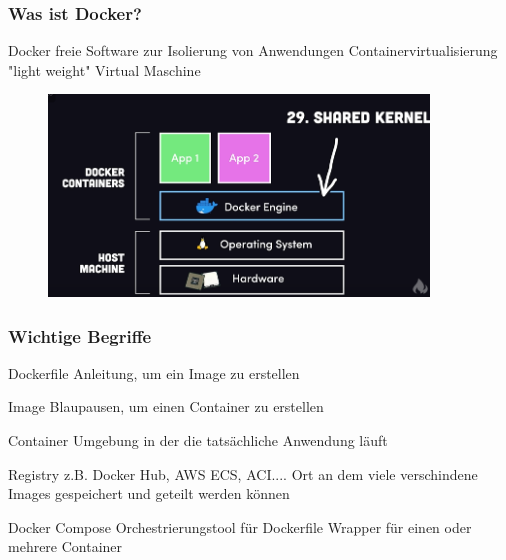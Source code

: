 \documentclass[22pt]{beamer}
\begin{document}
\begin{frame}[t]
    \frametitle{Was ist Docker?}
    \begin{block}{Docker}
        freie Software zur Isolierung von Anwendungen\newline
        Containervirtualisierung\newline
        "light weight" Virtual Maschine\newline
    \end{block}
    \begin{figure}[h]
        \centering
        \includegraphics[width=0.9\textwidth]{Bilder/Docker Concept.png}
    \end{figure}
\end{frame}


\begin{frame}[t]
    \frametitle{Wichtige Begriffe}
    \begin{block}{Dockerfile}
        Anleitung, um ein Image zu erstellen
    \end{block}
    \begin{block}{Image}
        Blaupausen, um einen Container zu erstellen
    \end{block}
    \begin{block}{Container}
        Umgebung in der die tatsächliche Anwendung läuft
    \end{block} \pause
    \begin{block}{Registry}
        z.B. Docker Hub, AWS ECS, ACI....
        Ort an dem viele verschindene Images gespeichert und geteilt werden können
    \end{block}
    \begin{block}{Docker Compose}
        Orchestrierungstool für Dockerfile\newline
        Wrapper für einen oder mehrere Container
    \end{block}
\end{frame}
\end{document}
